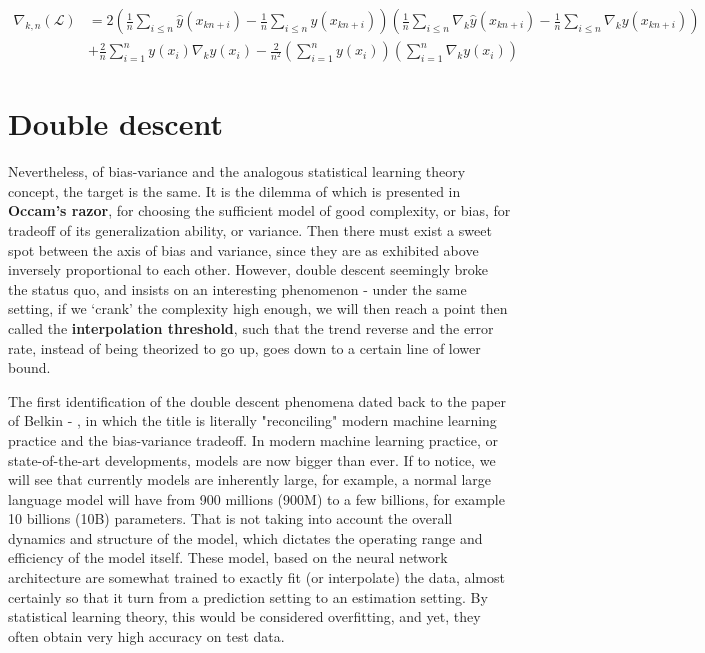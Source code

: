 \documentclass[twoside,10pt]{article}
\begin{document}
\begin{align}
\nabla_{k,n}(\mathcal{L})
&= 2\left(\frac{1}{n}\sum_{i\le n}\hat{y}(x_{kn+i}) - \frac{1}{n}\sum_{i\le n}y(x_{kn+i})\right)
   \left(\frac{1}{n}\sum_{i\le n}\nabla_k\hat{y}(x_{kn+i}) - \frac{1}{n}\sum_{i\le n}\nabla_k y(x_{kn+i})\right) \\
&+ \frac{2}{n}\sum_{i=1}^n y(x_i)\nabla_k y(x_i)
   - \frac{2}{n^2}\left(\sum_{i=1}^n y(x_i)\right)\left(\sum_{i=1}^n \nabla_k y(x_i)\right)
\end{align}

\section{Double descent}

Nevertheless, of bias-variance and the analogous statistical learning theory concept, the target is the same. It is the dilemma of which is presented in \textbf{Occam's razor}, for choosing the sufficient model of good complexity, or bias, for tradeoff of its generalization ability, or variance. Then there must exist a sweet spot between the axis of bias and variance, since they are as exhibited above inversely proportional to each other. However, double descent seemingly broke the status quo, and insists on an interesting phenomenon - under the same setting, if we `crank' the complexity high enough, we will then reach a point then called the \textbf{interpolation threshold}, such that the trend reverse and the error rate, instead of being theorized to go up, goes down to a certain line of lower bound. 

The first identification of the double descent phenomena dated back to the paper of Belkin - \cite{belkin_reconciling_2019}, in which the title is literally "reconciling" modern machine learning practice and the bias-variance tradeoff. In modern machine learning practice, or state-of-the-art developments, models are now bigger than ever. If to notice, we will see that currently models are inherently large, for example, a normal large language model will have from 900 millions (900M) to a few billions, for example 10 billions (10B) parameters. That is not taking into account the overall dynamics and structure of the model, which dictates the operating range and efficiency of the model itself. These model, based on the neural network architecture are somewhat trained to exactly fit (or interpolate) the data, almost certainly so that it turn from a prediction setting to an estimation setting. By statistical learning theory, this would be considered overfitting, and yet, they often obtain very high accuracy on test data.
\end{document}
